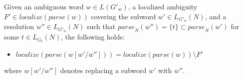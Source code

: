 \documentclass[acmsmall,review,anonymous]{acmart}\settopmatter{printfolios=true,printccs=false,printacmref=false}
\newcommand{\T}{\Sigma} %
\newcommand{\yield}{\mathit{yield}} %
\newcommand{\parse}{\mathit{parse}} %
\newcommand{\localize}{\mathit{localize}} %
\begin{document}
\begin{theorem}
  Given an ambiguous word $w \in L(G'_w)$, a localized ambiguity $F' \in \localize(\parse(w))$ covering the subword $w' \in L_{G'_w}(N)$, and a resolution $w'' \in L_{G'_w}(N)$ such that $\parse_N(w'') = \{t\} \subset \parse_N(w')$ for some $t \in L_{G_t}(N)$, the following holds:
  \begin{itemize}
  \item $\localize(\parse(w[w'/w''])) = \localize(\parse(w)) \setminus F'$
  \end{itemize}
  where $w[w'/w'']$ denotes replacing a subword $w'$ with $w''$.
\end{theorem}














\end{document}
